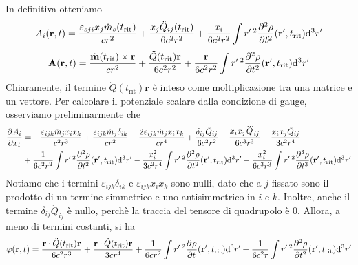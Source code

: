 \documentclass[a4paper,11pt]{article}
\renewcommand{\d}{\mathrm{d}}
\renewcommand{\vec}[1]{\mathbf{#1}}
\renewcommand{\t}{t_{\mathrm{rit}}}
\begin{document}
In definitiva otteniamo
\[A_i(\vec{r},t)=\frac{\varepsilon_{sji}x_j\dot{m}_s(\t)}{cr^2}+\frac{x_j\ddot{Q}_{ij}(\t)}{6c^2r^2}+\frac{x_i}{6c^2r^2}\int r'\,^2\pder[2]{\rho}{t}(\vec{r}',\t)\d^3r'\]
\[\vec{A}(\vec{r},t)=\frac{\dot{\vec{m}}(\t)\times\vec{r}}{cr^2}+\frac{\ddot{Q}(\t)\vec{r}}{6c^2r^2}+\frac{\vec{r}}{6c^2r^2}\int r'\,^2\pder[2]{\rho}{t}(\vec{r}',\t)\d^3r'\]
Chiaramente, il termine $\ddot{Q}(\t)\vec{r}$ è inteso come moltiplicazione tra una matrice e un vettore. Per calcolare il potenziale scalare dalla condizione di gauge, osserviamo preliminarmente che
\begin{align*}
	\pder{A_i}{x_i}&=-\frac{\varepsilon_{ijk}\ddot{m}_jx_ix_k}{c^2r^3}+\frac{\varepsilon_{ijk}\dot{m}_j\delta_{ik}}{cr^2}-\frac{2\varepsilon_{ijk}\dot{m}_jx_ix_k}{cr^4}+\frac{\delta_{ij}\ddot{Q}_{ij}}{6c^2r^2}-\frac{x_ix_j\dddot{Q}_{ij}}{6c^3r^3}-\frac{x_ix_j\ddot{Q}_{ij}}{3c^2r^4}+\\&+\frac{1}{6c^2r^2}\int r'\,^2\pder[2]{\rho}{t}(\vec{r}',\t)\d^3r'-\frac{x_i^2}{3c^2r^4}\int r'\,^2\pder[2]{\rho}{t}(\vec{r}',\t)\d^3r'-\frac{x_i^2}{6c^3r^3}\int r'\,^2\pder[3]{\rho}{t}(\vec{r}',\t)\d^3r'
\end{align*}
Notiamo che i termini $\varepsilon_{ijk}\delta_{ik}$ e $\varepsilon_{ijk}x_ix_k$ sono nulli, dato che a $j$ fissato sono il prodotto di un termine simmetrico e uno antisimmetrico in $i$ e $k$. Inoltre, anche il termine $\delta_{ij}\ddot{Q}_{ij}$ è nullo, perchè la traccia del tensore di quadrupolo è 0. Allora, a meno di termini costanti, si ha
\[\varphi(\vec{r},t)=\frac{\vec{r}\cdot\ddot{Q}(\t)\vec{r}}{6c^2r^3}+\frac{\vec{r}\cdot\dot{Q}(\t)\vec{r}}{3cr^4}+\frac{1}{6cr^2}\int r'\,^2\pder{\rho}{t}(\vec{r}',\t)\d^3r'+\frac{1}{6c^2r}\int r'\,^2\pder[2]{\rho}{t}(\vec{r}',\t)\d^3r'\]
\end{document}
